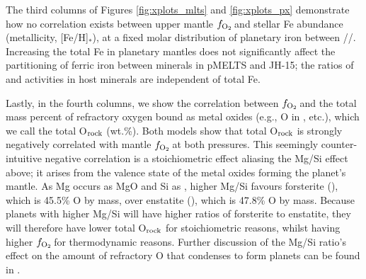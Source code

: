 \documentclass[fleqn,usenatbib,twocolumn]{mnras}
\newcommand{\fo}{$f_{\ce{O2}}$}
\newcommand{\ferric}{\ce{Fe^{3+}}}
\newcommand{\ferrous}{\ce{Fe^{2+}}}
\newcommand{\xfer}{Fe$^{3+}/\Sigma$Fe}
\newcommand{\todo}[1]{\textit{\textcolor{violet}{{#1}}}}
\begin{document}
The third columns of Figures \ref{fig:xplots_mlts} and \ref{fig:xplots_px} demonstrate how no correlation exists between upper mantle \fo\,and stellar Fe abundance (metallicity, [Fe/H]$_\ast$), at a fixed molar distribution of planetary iron between /\ferrous/\ferric. Increasing the total Fe in planetary mantles does not significantly affect the partitioning of ferric iron between minerals in pMELTS and JH-15; the ratios of  and  activities in host minerals are independent of total Fe.

Lastly, in the fourth columns, we show the correlation between \fo\,and the total mass percent of refractory oxygen bound as metal oxides (e.g., O in ,  etc.), which we call the total O$_{\rm rock}$ (wt.\%). Both models show that total O$_{\rm rock}$ is strongly negatively correlated with mantle \fo\,at both pressures. This seemingly counter-intuitive negative correlation is a stoichiometric effect aliasing the Mg/Si effect above; it arises from the valence state of the metal oxides forming the planet's mantle. As Mg occurs as MgO and Si as , higher Mg/Si favours forsterite (), which is 45.5\% O by mass, over enstatite (), which is 47.8\% O by mass. Because planets with higher Mg/Si will have higher ratios of forsterite to enstatite, they will therefore have lower total O$_{\rm rock}$ for stoichiometric reasons, whilst having higher \fo\,for thermodynamic reasons. Further discussion of the Mg/Si ratio's effect on the amount of refractory O that condenses to form planets can be found in \citet{unterborn_effects_2017}.





\end{document}
